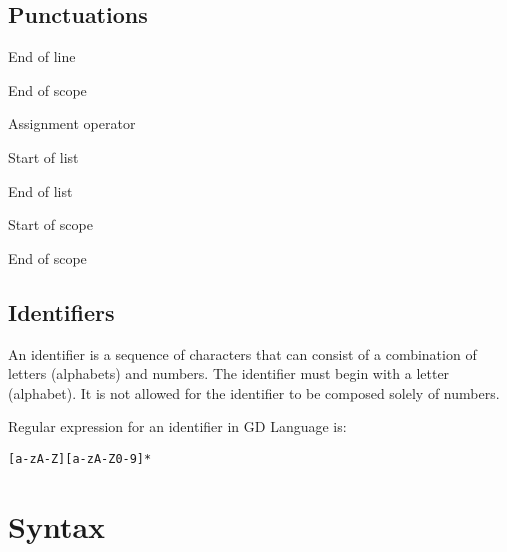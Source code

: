 \documentclass{article}
\begin{document}
\subsection{Punctuations}

\begin{description}[labelwidth=5cm]
  \item[;] End of line
  \item[:] End of scope
  \item[=] Assignment operator
  \item[(] Start of list
  \item[)] End of list
  \item[\{] Start of scope
  \item[\}] End of scope
\end{description}
\subsection{Identifiers}
An identifier is a sequence of characters that can consist of a combination of letters (alphabets) and numbers. The identifier must begin with a letter (alphabet). It is not allowed for the identifier to be composed solely of numbers.

Regular expression for an identifier in GD Language is:

\begin{verbatim}
[a-zA-Z][a-zA-Z0-9]*
\end{verbatim}

\section{Syntax}
\end{document}
